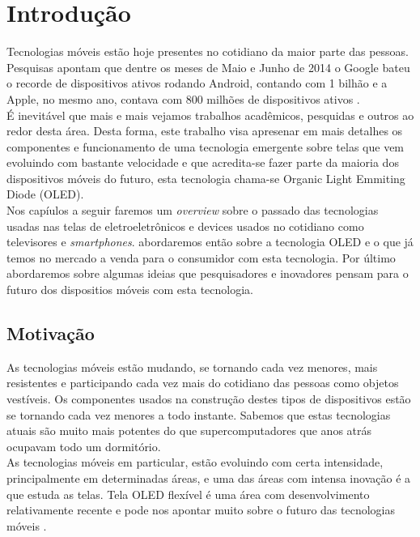 \chapter{Introdução}
\label{cap:introducao}

Tecnologias móveis estão hoje presentes no cotidiano da maior parte das pessoas. Pesquisas apontam que dentre os meses de Maio e Junho de 2014 o Google bateu o recorde de dispositivos ativos rodando Android, contando com 1 bilhão e a Apple, no mesmo ano, contava com 800 milhões de dispositivos ativos \cite{ResumoGoogleIOBAM:2014}. \\

É inevitável que mais e mais vejamos trabalhos acadêmicos, pesquidas e outros ao redor desta área. Desta forma, este trabalho visa apresenar em mais detalhes os componentes e funcionamento de uma tecnologia emergente sobre telas que vem evoluindo com bastante velocidade e que acredita-se fazer parte da maioria dos dispositivos móveis do futuro, esta tecnologia chama-se Organic Light Emmiting Diode (OLED). \\

Nos capíulos a seguir faremos um \textit{overview} sobre o passado das tecnologias usadas nas telas de eletroeletrônicos e devices usados no cotidiano como televisores e \textit{smartphones}. abordaremos então sobre a tecnologia OLED e o que já temos no mercado a venda para o consumidor com esta tecnologia. Por último abordaremos sobre algumas ideias que pesquisadores e inovadores pensam para o futuro dos dispositios móveis com esta tecnologia. 


\section{Motivação}
\label{sec:motivacao}

As tecnologias móveis estão mudando, se tornando cada vez menores, mais resistentes e participando cada vez mais do cotidiano das pessoas como objetos vestíveis. Os componentes usados na construção destes tipos de dispositivos estão se tornando cada vez menores a todo instante. Sabemos que estas tecnologias atuais são muito mais potentes do que supercomputadores que anos atrás ocupavam todo um dormitório. \\

As tecnologias móveis em particular, estão evoluindo com certa intensidade, principalmente em determinadas áreas, e uma das áreas com intensa inovação é a que estuda as telas. Tela OLED flexível é uma área com desenvolvimento relativamente recente e pode nos apontar muito sobre o futuro das tecnologias móveis \cite{FOLEDDRS:2014}.\\


